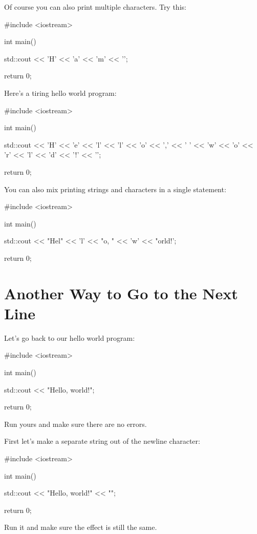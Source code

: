 



Of course you can also print multiple characters. Try this:
\begin{console}
#include <iostream>

int main()
{
    std::cout << 'H' << 'a' << 'm' << '\n';
         
    return 0;
}
\end{console}

Here's a tiring hello world program:
\begin{console}
#include <iostream>

int main()
{
    std::cout << 'H' << 'e' << 'l' << 'l' << 'o'
              << ',' << ' ' 
              << 'w' << 'o' << 'r' << 'l' << 'd' 
              << '!' 
              << '\n';
         
    return 0;
}
\end{console}

You can also mix printing strings and characters in a single statement:
\begin{console}
#include <iostream>

int main()
{
    std::cout << "Hel" << 'l' << "o, " 
              << 'w' << "orld!\n';
         
    return 0;
}
\end{console}







\newpage\section{Another Way to Go to the Next Line}

Let's go back to our hello world program:
\begin{console}
#include <iostream>

int main()
{
    std::cout << "Hello, world!\n";

    return 0;
}
\end{console}
Run yours and make sure there are no errors.

First let's make a separate string out of the newline character:
\begin{console}
#include <iostream>

int main()
{
    std::cout << "Hello, world!" << "\n";

    return 0;
}
\end{console}
Run it and make sure the effect is still the same.

